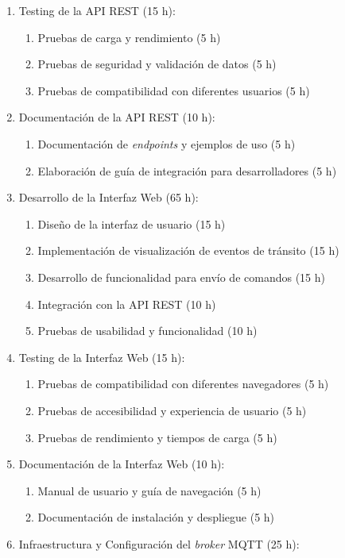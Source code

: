 \documentclass[
11pt, %
]{charter}
\begin{document}
\begin{enumerate}
\item Testing de la API REST (15 h):
\begin{enumerate}
\item Pruebas de carga y rendimiento (5 h)
\item Pruebas de seguridad y validación de datos (5 h)
\item Pruebas de compatibilidad con diferentes usuarios (5 h)
\end{enumerate}
\item Documentación de la API REST (10 h):
\begin{enumerate}
\item Documentación de  \textit{endpoints} y ejemplos de uso (5 h)
\item Elaboración de guía de integración para desarrolladores (5 h)
\end{enumerate}
\item Desarrollo de la Interfaz Web (65 h):
\begin{enumerate}
\item Diseño de la interfaz de usuario (15 h)
\item Implementación de visualización de eventos de tránsito (15 h)
\item Desarrollo de funcionalidad para envío de comandos (15 h)
\item Integración con la API REST (10 h)
\item Pruebas de usabilidad y funcionalidad (10 h)
\end{enumerate}
\item Testing de la Interfaz Web (15 h):
\begin{enumerate}
\item Pruebas de compatibilidad con diferentes navegadores (5 h)
\item Pruebas de accesibilidad y experiencia de usuario (5 h)
\item Pruebas de rendimiento y tiempos de carga (5 h)
\end{enumerate}
\item Documentación de la Interfaz Web (10 h):
\begin{enumerate}
\item Manual de usuario y guía de navegación (5 h)
\item Documentación de instalación y despliegue (5 h)
\end{enumerate}
\item Infraestructura y Configuración del  \textit{broker} MQTT (25 h):
\begin{enumerate}

\end{enumerate}
\end{enumerate}
\end{document}
